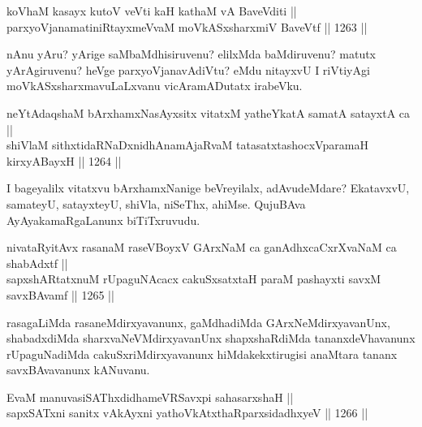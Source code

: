 \begin{shl}
koV\s haM kasayx kutoV veVti kaH kathaM vA BaveVditi ||  \\
parxyoVjanamatiniRtayxmeVvaM moVkASxsharxmiV BaveVtf \hfill || 1263 ||  
\end{shl}

\begin{artha}
nAnu yAru? yArige saMbaMdhisiruvenu? elilxMda baMdiruvenu? matutx yArAgiruvenu? heVge parxyoVjanavAdiVtu? eMdu nitayxvU I riVtiyAgi moVkASxsharxmavuLaLxvanu vicAramADutatx irabeVku.
\end{artha}


\begin{shl}
neYtAdaqshaM bArxhamxNasAyxsitx vitatxM yatheYkatA samatA satayxtA ca || \\
shiVlaM sithxtidaRNaDxnidhAnamAjaRvaM tatasatxtashocxVparamaH kirxyABayxH \hfill || 1264 ||  
\end{shl}

\begin{artha}
I bageyalilx vitatxvu bArxhamxNanige beVreyilalx, adAvudeMdare? EkatavxvU, samateyU, satayxteyU, shiVla, niSeThx, ahiMse. QujuBAva AyAyakamaRgaLanunx biTiTxruvudu.
\end{artha}

\begin{shl}
nivataRyitAvx rasanaM raseVBoyxV GArxNaM ca ganAdhxcaCxrXvaNaM ca shabAdxtf || \\
sapxshARtatxnuM rUpaguNAcacx cakuSxsatxtaH paraM pashayxti savxM savxBAvamf \hfill || 1265 ||  
\end{shl}

\begin{artha}
rasagaLiMda rasaneMdirxyavanunx, gaMdhadiMda GArxNeMdirxyavanUnx, shabadxdiMda sharxvaNeVMdirxyavanUnx shapxshaRdiMda tananxdeVhavanunx rUpaguNadiMda cakuSxriMdirxyavanunx hiMdakekxtirugisi anaMtara tananx savxBAvavanunx kANuvanu.
\end{artha}

\begin{shl}
EvaM manuvasiSAThxdidhameVRSavxpi sahasarxshaH || \\
sapxSATxni sanitx vAkAyxni yathoVkAtxthaRparxsidadhxyeV \hfill || 1266 || 
\end{shl}


